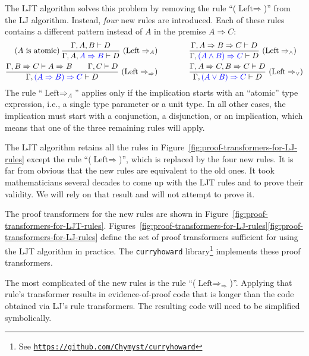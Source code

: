 The LJT algorithm solves this problem by removing the rule \textsf{``}($\text{Left}\Rightarrow$)\textsf{''}
from the LJ algorithm. Instead, \emph{four} new rules are introduced.
Each of these rules contains a different pattern instead of $A$ in
the premise $A\Rightarrow C$:
\begin{align*}
\text{(}A\text{ is atomic)\,}\frac{\Gamma,A,B\vdash D}{\Gamma,A,{\color{blue}A\Rightarrow B}\vdash D}~(\text{Left}\Rightarrow_{A})\qquad & \qquad\frac{\Gamma,A\Rightarrow B\Rightarrow C\vdash D}{\Gamma,{\color{blue}(A\wedge B)\Rightarrow C}\vdash D}~(\text{Left}\Rightarrow_{\wedge})\\
\frac{\Gamma,B\Rightarrow C\vdash A\Rightarrow B\quad\quad\Gamma,C\vdash D}{\Gamma,{\color{blue}(A\Rightarrow B)\Rightarrow C}\vdash D}~(\text{Left}\Rightarrow_{\Rightarrow})\qquad & \qquad\frac{\Gamma,A\Rightarrow C,B\Rightarrow C\vdash D}{\Gamma,{\color{blue}(A\vee B)\Rightarrow C}\vdash D}~(\text{Left}\Rightarrow_{\vee})
\end{align*}
The rule \textsf{``}$\text{Left}\Rightarrow_{A}$\textsf{''} applies only if the implication
starts with an \textsf{``}atomic\textsf{''} type expression, i.e., a single type parameter
or a unit type. In all other cases, the implication must start with
a conjunction, a disjunction, or an implication, which means that
one of the three remaining rules will apply.

The LJT algorithm retains all the rules in Figure~\ref{fig:proof-transformers-for-LJ-rules}
except the rule \textsf{``}($\text{Left}\Rightarrow$)\textsf{''}, which is replaced
by the four new rules. It is far from obvious that the new rules are
equivalent to the old ones. It took mathematicians several decades
to come up with the LJT rules and to prove their validity. We will
rely on that result and will not attempt to prove it.

The proof transformers for the new rules are shown in Figure~\ref{fig:proof-transformers-for-LJT-rules}.
Figures~\ref{fig:proof-transformers-for-LJ-rules}\textendash \ref{fig:proof-transformers-for-LJ-rules}
define the set of proof transformers sufficient for using the LJT
algorithm in practice. The \lstinline!curryhoward! library\texttt{}\footnote{See \texttt{\href{https://github.com/Chymyst/curryhoward}{https://github.com/Chymyst/curryhoward}}}
implements these proof transformers.

The most complicated of the new rules is the rule \textsf{``}($\text{Left}\Rightarrow_{\Rightarrow}$)\textsf{''}.
Applying that rule\textsf{'}s transformer results in evidence-of-proof code
that is longer than the code obtained via LJ\textsf{'}s rule transformers.
The resulting code will need to be simplified symbolically. 

